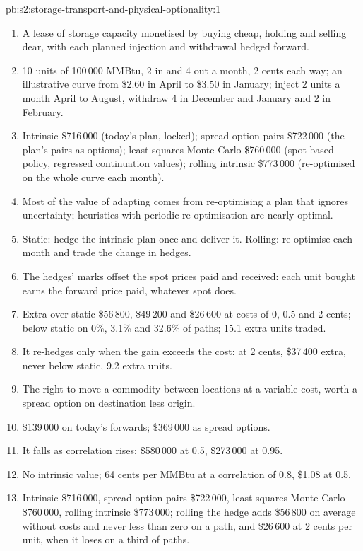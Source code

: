 \begin{solution}{pb:s2:storage-transport-and-physical-optionality:1}
\begin{enumerate}
\item A lease of storage capacity monetised by buying cheap, holding and selling dear, with each planned injection and withdrawal hedged forward.
\item 10 units of 100\,000 MMBtu, 2 in and 4 out a month, 2 cents each way; an illustrative curve from \$2.60 in April to \$3.50 in January; inject 2
units a month April to August, withdraw 4 in December and January and 2 in February.
\item Intrinsic \$716\,000 (today's plan, locked); spread-option pairs \$722\,000 (the plan's pairs as options); least-squares Monte Carlo \$760\,000
(spot-based policy, regressed continuation values); rolling intrinsic \$773\,000 (re-optimised on the whole curve each month).
\item Most of the value of adapting comes from re-optimising a plan that ignores uncertainty; heuristics with periodic re-optimisation are nearly
optimal.
\item Static: hedge the intrinsic plan once and deliver it. Rolling: re-optimise each month and trade the change in hedges.
\item The hedges' marks offset the spot prices paid and received: each unit bought earns the forward price paid, whatever spot does.
\item Extra over static \$56\,800, \$49\,200 and \$26\,600 at costs of 0, 0.5 and 2 cents; below static on 0\%, 3.1\% and 32.6\% of paths; 15.1 extra
units traded.
\item It re-hedges only when the gain exceeds the cost: at 2 cents, \$37\,400 extra, never below static, 9.2 extra units.
\item The right to move a commodity between locations at a variable cost, worth a spread option on destination less origin.
\item \$139\,000 on today's forwards; \$369\,000 as spread options.
\item It falls as correlation rises: \$580\,000 at 0.5, \$273\,000 at 0.95.
\item No intrinsic value; 64 cents per MMBtu at a correlation of 0.8, \$1.08 at 0.5.
\item Intrinsic \$716\,000, spread-option pairs \$722\,000, least-squares Monte Carlo \$760\,000, rolling intrinsic \$773\,000; rolling the hedge adds
\$56\,800 on average without costs and never less than zero on a path, and \$26\,600 at 2 cents per unit, when it loses on a third of paths.

\end{enumerate}
\end{solution}
